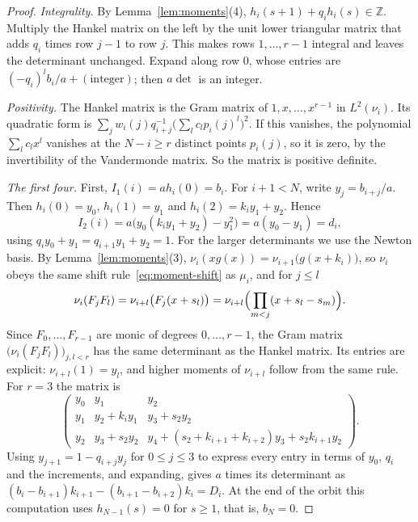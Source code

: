\documentclass[11pt]{article}
\theoremstyle{definition}
\theoremstyle{remark}
\begin{document}
\begin{proof}
\emph{Integrality.} By Lemma~\ref{lem:moments}(4),
$h_i(s+1)+q_ih_i(s)\in\mathbb Z$. Multiply the Hankel matrix on the left by the unit lower
triangular matrix that adds $q_i$ times row $j-1$ to row $j$. This makes rows
$1,\dots,r-1$ integral and leaves the determinant unchanged. Expand along row $0$, whose entries
are $(-q_i)^lb_i/a+(\text{integer})$; then $a\det$ is an integer.

\emph{Positivity.} The Hankel matrix is the Gram matrix of $1,x,\dots,x^{r-1}$ in $L^2(\nu_i)$.
Its quadratic form is $\sum_jw_i(j)q_{i+j}^{-1}\bigl(\sum_lc_lp_i(j)^l\bigr)^2$. If this
vanishes, the polynomial $\sum_lc_lx^l$ vanishes at the $N-i\ge r$ distinct points $p_i(j)$, so
it is zero, by the invertibility of the Vandermonde matrix. So the matrix is positive definite.

\emph{The first four.} First, $I_1(i)=ah_i(0)=b_i$.
For $i+1<N$, write $y_j=b_{i+j}/a$. Then
$h_i(0)=y_0$, $h_i(1)=y_1$ and
$h_i(2)=k_iy_1+y_2$. Hence
\[
 I_2(i)=a\bigl(y_0(k_iy_1+y_2)-y_1^2\bigr)
       =a(y_0-y_1)=d_i,
\]
using $q_iy_0+y_1=q_{i+1}y_1+y_2=1$.
For the larger determinants we use the Newton basis. By
Lemma~\ref{lem:moments}(3), $\nu_i(xg(x))=\nu_{i+1}\bigl(g(x+k_i)\bigr)$, so
$\nu_i$ obeys the same shift rule~\eqref{eq:moment-shift} as $\mu_i$, and for
$j\le l$
\[
 \nu_i(F_jF_l)=\nu_{i+l}\bigl(F_j(x+s_l)\bigr)
 =\nu_{i+l}\Bigl(\prod_{m<j}(x+s_l-s_m)\Bigr).
\]
Since $F_0,\dots,F_{r-1}$ are monic of degrees $0,\dots,r-1$, the Gram matrix
$\bigl(\nu_i(F_jF_l)\bigr)_{j,l<r}$ has the same determinant as the Hankel
matrix. Its entries are explicit: $\nu_{i+l}(1)=y_l$, and higher moments
of $\nu_{i+l}$ follow from the same rule. For $r=3$ the matrix is
\[
\begin{pmatrix}
 y_0&y_1&y_2\\
 y_1&y_2+k_iy_1&y_3+s_2y_2\\
 y_2&y_3+s_2y_2&y_4+(s_2+k_{i+1}+k_{i+2})y_3+s_2k_{i+1}y_2
\end{pmatrix}.
\]
Using $y_{j+1}=1-q_{i+j}y_j$ for $0\le j\le3$ to express every entry in
terms of $y_0$, $q_i$ and the increments, and expanding, gives $a$ times its
determinant as
$(b_i-b_{i+1})k_{i+1}-(b_{i+1}-b_{i+2})k_i=D_i$. At the end of the orbit
this computation uses $h_{N-1}(s)=0$ for $s\ge1$, that is, $b_N=0$.


\end{proof}
\end{document}
